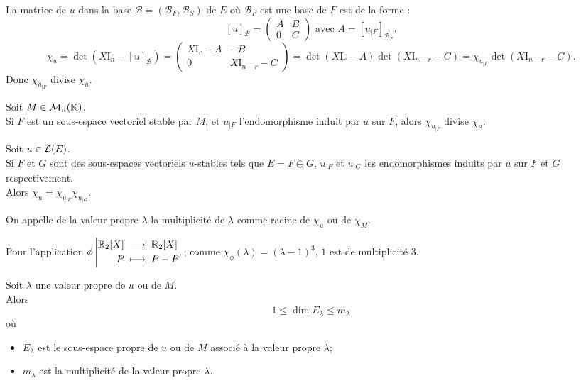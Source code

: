 \documentclass[a4paper]{book}
\begin{document}
\begin{Demonstration} La matrice de $u$ dans la base $\mathcal{B} =(\mathcal{B} _F,\mathcal{B} _S)$ de $E$ où $\mathcal{B} _F$ est une base de $F$ est de la forme :
$$[u]_{\mathcal{B}}= \begin{pmatrix}
A & B \\ 0 & C
\end{pmatrix}\text{ avec } A= [u_{|F}]_{\mathcal{B} _F}.$$
$$\chi_u = \det(X \mathrm{I}_n-[u]_{\mathcal{B}})=\begin{pmatrix}
X \mathrm{I}_r - A & -B \\ 0 & X \mathrm{I}_{n-r}-C
\end{pmatrix} = \det(X \mathrm{I}_r - A) \det(X \mathrm{I}_{n-r}-C) =\chi_{u_{|F}} \det(X \mathrm{I}_{n-r}-C).$$ Donc $\chi_{u_{|F}}$ divise $\chi       _u$.
\end{Demonstration}

\begin{Proposition}
Soit $M\in \mathcal{M}_{n}(\mathbb{K})$.\\
Si $F$ est un sous-espace vectoriel stable par $M$,
et $u_{|F}$ l'endomorphisme induit par $u$ sur $F$,
alors $\chi_{u_{|F}}$ divise $\chi       _u$.
\end{Proposition}
\begin{Proposition}
Soit $u\in \mathcal{L}(E)$.\\
Si $F$ et $G$ sont des sous-espaces vectoriels $u$-stables tels que $E = F\oplus G$,
$u_{|F}$ et $u_{|G}$ les endomorphismes induits par $u$ sur $F$ et $G$ respectivement.\\
Alors $\chi_u = \chi_{u_{|F}}\chi_{u_{|G}}$.
\end{Proposition}
\begin{Definition}[Multiplicité]
On appelle  de la valeur propre $\lambda$ la multiplicité de $\lambda$ comme racine de $\chi_u$ ou de $\chi_M$.
\end{Definition}
\begin{Exemple}
Pour l'application $
{\phi}\left|\begin{aligned}{\mathbb{R}_2[X]}&\;\longrightarrow\;{\mathbb{R}_2[X]}\\{P}&\;\longmapsto\;{P-P'}\end{aligned}\right.$, comme $\chi_\phi(\lambda    )= (\lambda    -1)^3$, $1$ est de multiplicité 3.
\end{Exemple}

\begin{Theoreme}
Soit $\lambda$ une valeur propre de $u$ ou de $M$.\\
Alors $$1\leq \dim E_\lambda    \leq m_\lambda$$ où
\begin{itemize}
\item $E_\lambda$ est le sous-espace propre de $u$ ou de $M$ associé à la valeur propre $\lambda$;
\item $m_\lambda$ est la multiplicité de la valeur propre $\lambda$.
\end{itemize}
\end{Theoreme}
\end{document}
